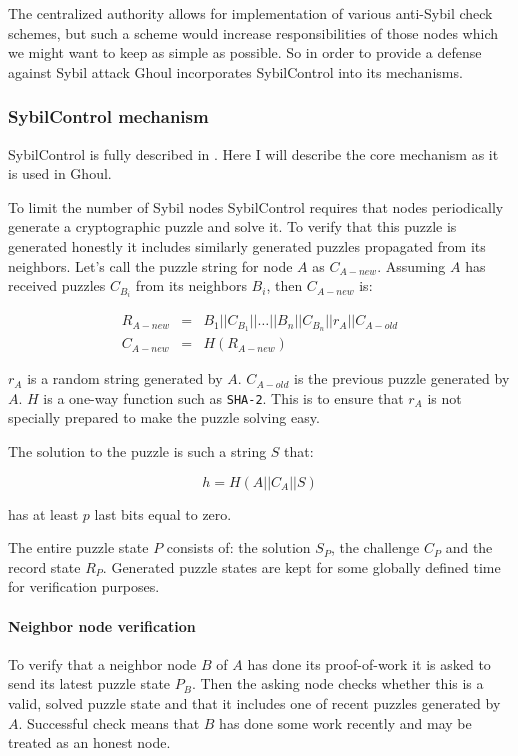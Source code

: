   The centralized authority allows for implementation of various anti-Sybil
  check schemes, but such a scheme would increase responsibilities of those
  nodes which we might want to keep as simple as possible. So in order to
  provide a defense against Sybil attack Ghoul incorporates SybilControl into
  its mechanisms.

\subsubsection{SybilControl mechanism}
  SybilControl is fully described in \cite{li12}. Here I will describe the core
  mechanism as it is used in Ghoul. 

  To limit the number of Sybil nodes SybilControl requires that nodes
  periodically generate a cryptographic puzzle and solve it. To verify that
  this puzzle is generated honestly it includes similarly generated puzzles
  propagated from its neighbors. Let's call the puzzle string for node $A$ as
  $C_{A-new}$. Assuming $A$ has received puzzles $C_{B_i}$ from its neighbors
  $B_{i}$, then $C_{A-new}$ is:

  \begin{eqnarray*}
      R_{A-new} &=& B_1||C_{B_1}||\ldots||B_n||C_{B_n}||r_A||C_{A-old}\\
    C_{A-new} &=& H\left(R_{A-new}\right)
  \end{eqnarray*}

  $r_A$ is a random string generated by $A$. $C_{A-old}$ is the previous puzzle
  generated by $A$. $H$ is a one-way function such as \texttt{SHA-2}. This is to
  ensure that $r_A$ is not specially prepared to make the puzzle solving easy.

  The solution to the puzzle is such a string $S$ that:

  \[ h = H\left(A||C_A||S\right)\]

  has at least $p$ last bits equal to zero.

  The entire puzzle state $P$ consists of: the solution $S_P$, the challenge
  $C_P$ and the record state $R_P$. Generated puzzle states are kept for some
  globally defined time for verification purposes.

  \paragraph{Neighbor node verification}
  To verify that a neighbor node $B$ of $A$ has done its proof-of-work it is
  asked to send its latest puzzle state $P_B$. Then the asking node checks
  whether this is a valid, solved puzzle state and that it includes one of
  recent puzzles generated by $A$. Successful check means that $B$ has done some
  work recently and may be treated as an honest node.

